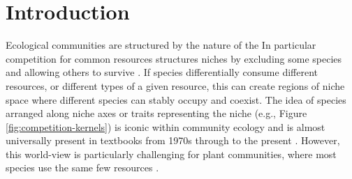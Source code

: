 \documentclass[a4paper,11pt]{article}
\begin{document}
\section{Introduction}

%
Ecological communities are structured by the nature of the
In particular competition for common resources structures niches by
excluding some species and allowing others to survive
\citep[e.g.][]{Gause-1934,Lack-1947,MacArthur-1967}.
%
If species differentially consume different resources, or different
types of a given resource, this can create regions of niche space where
different species can stably occupy and coexist.
The idea of species arranged along niche axes or traits representing the niche (e.g., Figure
\ref{fig:competition-kernels}) is iconic within community ecology and
is almost universally present in textbooks from 1970s through to the
present \citep[e.g.,][]{Krebs-1972, Ricklefs-1973, Ricklefs-1999,
  Krebs-2013}.
%
However, this world-view is particularly challenging for plant
communities, where most species use the same few resources
\citep[e.g.,][]{Whittaker-1970, Grime-1979, Hubbell-2001,
  Westoby-2002}.
\end{document}
